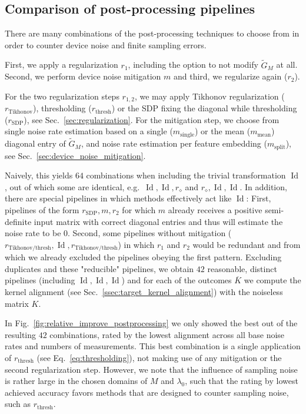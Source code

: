 \documentclass[twocolumn,superscriptaddress,nofootinbib]{revtex4-2}
\begin{document}
\subsection{Comparison of post-processing pipelines}\label{sec:postprocessing_rating}
There are many combinations of the post-processing techniques to choose from in order to counter device noise and finite sampling errors.

First, we apply a regularization $r_1$, including the option to not modify $\tilde{G}_M$ at all.
Second, we perform device noise mitigation $m$ and third, we regularize again ($r_2$).

For the two regularization steps $r_{1,2}$, we may apply Tikhonov regularization ($r_\mathrm{Tikhonov}$), thresholding ($r_\mathrm{thresh}$) or the \ac{SDP} fixing the diagonal while thresholding ($r_\mathrm{SDP}$), see Sec.~\ref{sec:regularization}.
For the mitigation step, we choose from single noise rate estimation based on a single ($m_\mathrm{single}$) or the mean ($m_\mathrm{mean}$) diagonal entry of $\tilde{G}_M$, and noise rate estimation per feature embedding ($m_\mathrm{split}$), see Sec.~\ref{sec:device_noise_mitigation}.

Naively, this yields $64$ combinations when including the trivial transformation $\operatorname{Id}$, out of which some are identical, e.g.~$\operatorname{Id}, \operatorname{Id}, r_\diamond$ and $r_\diamond, \operatorname{Id}, \operatorname{Id}$.
In addition, there are special pipelines in which methods effectively act like $\operatorname{Id}$:
First, pipelines of the form $r_\mathrm{SDP}, m, r_2$ for which $m$ already receives a positive semi-definite input matrix with correct diagonal entries and thus will estimate the noise rate to be $0$.
Second, some pipelines without mitigation ($r_\textrm{Tikhonov/thresh}, \operatorname{Id}, r_\mathrm{Tikhonov/thresh}$) in which $r_1$ and $r_2$ would be redundant and from which we already excluded the pipelines obeying the first pattern.
Excluding duplicates and these "reducible" pipelines, we obtain $42$ reasonable, distinct pipelines (including $\operatorname{Id}, \operatorname{Id},\operatorname{Id}$) and for each of the outcomes $\overline{K}$ we compute the kernel alignment (see Sec.~\ref{ssec:target_kernel_alignment}) with the noiseless matrix $K$.

In Fig.~\ref{fig:relative_improve_postprocessing} we only showed the best out of the resulting $42$ combinations, rated by the lowest alignment across all base noise rates and numbers of measurements.
This best combination is a single application of $r_\mathrm{thresh}$ (see Eq.~\eqref{eq:thresholding}), not making use of any mitigation or the second regularization step.
However, we note that the influence of sampling noise is rather large in the chosen domains of $M$ and $\lambda_0$, such that the rating by lowest achieved accuracy favors methods that are designed to counter sampling noise, such as $r_\mathrm{thresh}$.
\end{document}
